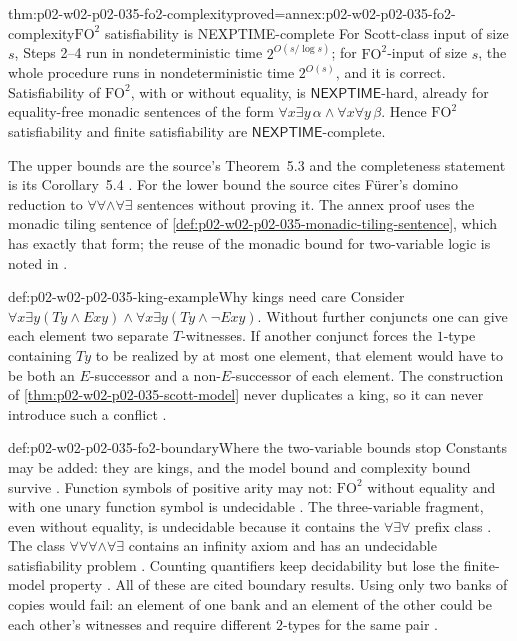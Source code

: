 \begin{hbtheorem}{thm:p02-w02-p02-035-fo2-complexity}{proved=annex:p02-w02-p02-035-fo2-complexity}{\(\mathrm{FO}^2\) satisfiability is NEXPTIME-complete}
For Scott-class input of size \(s\), Steps 2--4 run in nondeterministic time
\(2^{O(s/\log s)}\); for \(\mathrm{FO}^2\)-input of size \(s\), the whole
procedure runs in nondeterministic time \(2^{O(s)}\), and it is correct.
Satisfiability of \(\mathrm{FO}^2\), with or without equality, is
\(\mathsf{NEXPTIME}\)-hard, already for equality-free monadic sentences of the
form \(\forall x\exists y\,\alpha\land\forall x\forall y\,\beta\).  Hence
\(\mathrm{FO}^2\) satisfiability and finite satisfiability are
\(\mathsf{NEXPTIME}\)-complete.
\end{hbtheorem}

The upper bounds are the source's Theorem~5.3 and the completeness statement
is its Corollary~5.4 \cite[thm.~5.3 and cor.~5.4]{GradelKolaitisVardi1997}.
For the lower bound the source cites F\"urer's domino reduction to
\(\forall\forall\land\forall\exists\) sentences without proving it.  The
annex proof uses the monadic tiling sentence of
\cref{def:p02-w02-p02-035-monadic-tiling-sentence}, which has exactly that
form; the reuse of the monadic bound for two-variable logic is noted in
\cite[remark after cor.~6.2.14]{BorgerGradelGurevich1997}.

\begin{hbexample}{def:p02-w02-p02-035-king-example}{Why kings need care}
Consider
\(\forall x\exists y(Ty\land Exy)\land\forall x\exists y(Ty\land\neg Exy)\).
Without further conjuncts one can give each element two separate
\(T\)-witnesses.  If another conjunct forces the \(1\)-type containing \(Ty\)
to be realized by at most one element, that element would have to be both an
\(E\)-successor and a non-\(E\)-successor of each element.  The construction of
\cref{thm:p02-w02-p02-035-scott-model} never duplicates a king, so it can
never introduce such a conflict \cite[p.~7]{GradelKolaitisVardi1997}.
\end{hbexample}

\begin{hbwarning}{def:p02-w02-p02-035-fo2-boundary}{Where the two-variable bounds stop}
Constants may be added: they are kings, and the model bound and complexity
bound survive \cite[p.~11]{GradelKolaitisVardi1997}.  Function symbols of
positive arity may not: \(\mathrm{FO}^2\) without equality and with one unary
function symbol is undecidable \cite[p.~11]{GradelKolaitisVardi1997}.  The
three-variable fragment, even without equality, is undecidable because it
contains the \(\forall\exists\forall\) prefix class
\cite[p.~1]{GradelKolaitisVardi1997}.  The class
\(\forall\forall\forall\land\forall\exists\) contains an infinity axiom and has
an undecidable satisfiability problem \cite[p.~11]{GradelKolaitisVardi1997}.
Counting quantifiers keep decidability but lose the finite-model property
\cite[p.~11]{GradelKolaitisVardi1997}.  All of these are cited boundary
results.  Using only two banks of copies would fail: an element of one bank
and an element of the other could be each other's witnesses and require
different \(2\)-types for the same pair \cite[p.~10]{GradelKolaitisVardi1997}.
\end{hbwarning}


